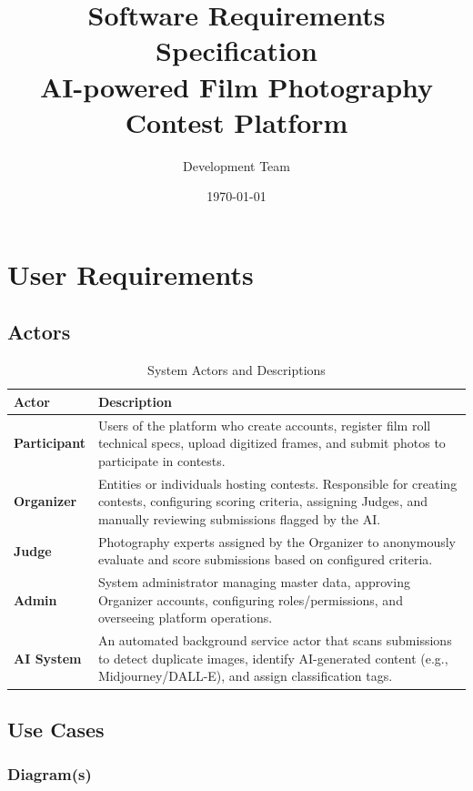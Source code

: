 \documentclass[12pt,a4paper]{article}
\title{\textbf{Software Requirements Specification}\\ \large AI-powered Film Photography Contest Platform}
\author{Development Team}
\date{\today}
\begin{document}
\maketitle

\tableofcontents
\newpage

\section{User Requirements}

\subsection{Actors}

\begin{table}[h!]
\centering
\caption{System Actors and Descriptions}
\label{tab:actors}
\begin{tabularx}{\textwidth}{l X}
\toprule
\textbf{Actor} & \textbf{Description} \\
\midrule
\textbf{Participant} & Users of the platform who create accounts, register film roll technical specs, upload digitized frames, and submit photos to participate in contests. \\
\textbf{Organizer} & Entities or individuals hosting contests. Responsible for creating contests, configuring scoring criteria, assigning Judges, and manually reviewing submissions flagged by the AI. \\
\textbf{Judge} & Photography experts assigned by the Organizer to anonymously evaluate and score submissions based on configured criteria. \\
\textbf{Admin} & System administrator managing master data, approving Organizer accounts, configuring roles/permissions, and overseeing platform operations. \\
\textbf{AI System} & An automated background service actor that scans submissions to detect duplicate images, identify AI-generated content (e.g., Midjourney/DALL-E), and assign classification tags. \\
\bottomrule
\end{tabularx}
\end{table}

\subsection{Use Cases}

\subsubsection{Diagram(s)}
\end{document}
